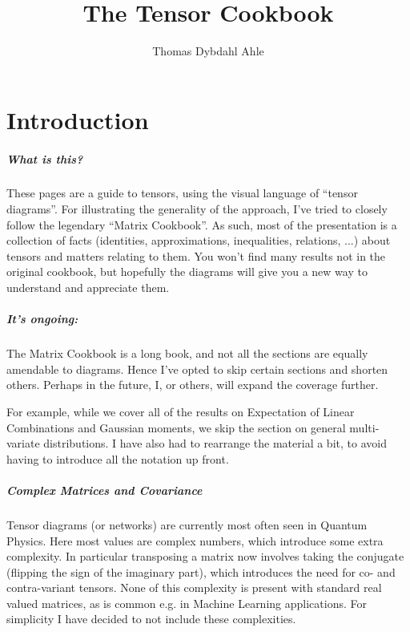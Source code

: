 \documentclass[oneside]{book}
\title{The Tensor Cookbook}
\author{Thomas Dybdahl Ahle}
\begin{document}

\maketitle

\chapter{Introduction}
\paragraph{What is this?}
These pages are a guide to tensors, using the visual language of ``tensor diagrams''.
For illustrating the generality of the approach, I've tried to closely follow the legendary ``Matrix Cookbook''.
As such, most of the presentation is a collection of facts (identities, approximations, inequalities, relations, ...) about tensors and matters relating to them.
You won't find many results not in the original cookbook, but hopefully the diagrams will give you a new way to understand and appreciate them.

\paragraph{It's ongoing:}
The Matrix Cookbook is a long book, and not all the sections are equally amendable to diagrams.
Hence I've opted to skip certain sections and shorten others.
Perhaps in the future, I, or others, will expand the coverage further.

For example, while we cover all of the results on Expectation of Linear Combinations and Gaussian moments, we skip the section on general multi-variate distributions.
I have also had to rearrange the material a bit, to avoid having to introduce all the notation up front.

\paragraph{Complex Matrices and Covariance}
Tensor diagrams (or networks) are currently most often seen in Quantum Physics.
Here most values are complex numbers, which introduce some extra complexity.
In particular transposing a matrix now involves taking the conjugate (flipping the sign of the imaginary part), which introduces the need for co- and contra-variant tensors.
None of this complexity is present with standard real valued matrices, as is common e.g. in Machine Learning applications.
For simplicity I have decided to not include these complexities.
\end{document}
